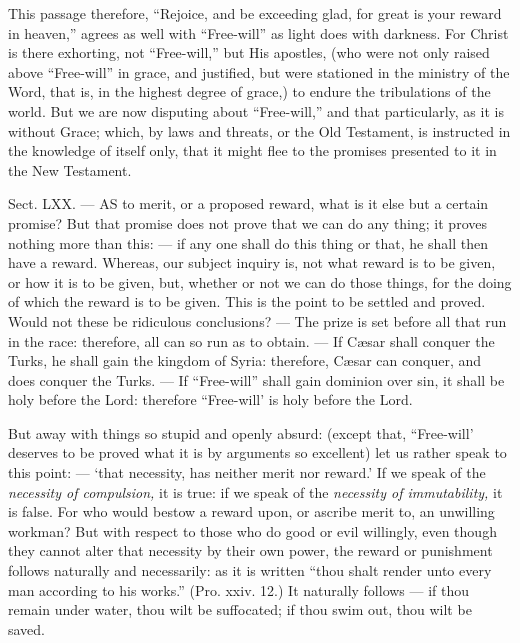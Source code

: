 This passage therefore, “Rejoice, and be exceeding glad, for great is your reward in heaven,” agrees as well with “Free-will” as light does with darkness. For Christ is there exhorting, not “Free-will,” but His apostles, (who were not only raised above “Free-will” in grace, and justified, but were stationed in the ministry of the Word, that is, in the highest degree of grace,) to endure the tribulations of the world. But we are now disputing about “Free-will,” and that particularly, as it is without Grace; which, by laws and threats, or the Old Testament, is instructed in the knowledge of itself only, that it might flee to the promises presented to it in the New Testament.


Sect. LXX. — AS to merit, or a proposed reward, what is it else but a certain promise? But that promise does not prove that we can do any thing; it proves nothing more than this: — if any one shall do this thing or that, he shall then have a reward. Whereas, our subject inquiry is, not what reward is to be given, or how it is to be given, but, whether or not we can do those things, for the doing of which the reward is to be given. This is the point to be settled and proved. Would not these be ridiculous conclusions? — The prize is set before all that run in the race: therefore, all can so run as to obtain. — If Cæsar shall conquer the Turks, he shall gain the kingdom of Syria: therefore, Cæsar can conquer, and does conquer the Turks. — If “Free-will” shall gain dominion over sin, it shall be holy before the Lord: therefore “Free-will’ is holy before the Lord.

But away with things so stupid and openly absurd: (except that, “Free-will’ deserves to be proved what it is by arguments so excellent) let us rather speak to this point: — ‘that necessity, has neither merit nor reward.’ If we speak of the \emph{necessity of compulsion, }it is true: if we speak of the \emph{necessity of immutability, }it is false. For who would bestow a reward upon, or ascribe merit to, an unwilling workman? But with respect to those who do good or evil willingly, even though they cannot alter that necessity by their own power, the reward or punishment follows naturally and necessarily: as it is written “thou shalt render unto every man according to his works.” (Pro. xxiv. 12.) It naturally follows — if thou remain under water, thou wilt be suffocated; if thou swim out, thou wilt be saved.

